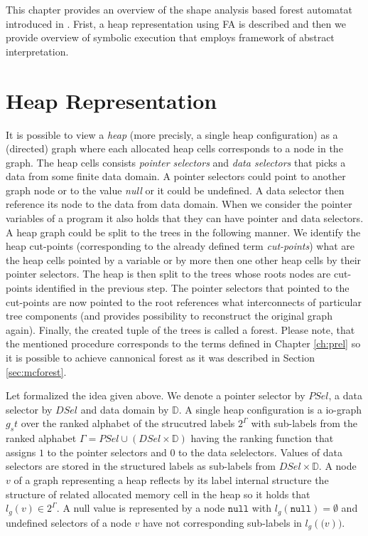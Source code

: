 This chapter provides an overview of the shape analysis based forest automatat introduced in \cite{formalmethods}.
Frist, a heap representation using FA is described and then
we provide overview of symbolic execution that employs framework of abstract interpretation.

\section{Heap Representation}
\label{sec:hd}

It is possible to view a \emph{heap} (more precisly, a single heap configuration)
as a (directed) graph where each allocated heap cells corresponds to a node in the graph.
The heap cells consists \emph{pointer selectors} and \emph{data selectors} that picks a data from some finite data domain.
A pointer selectors could point to another graph node or to the value \emph{null} or it could be undefined.
A data selector then reference its node to the data from data domain.
When we consider the pointer variables of a program it also holds that they can have pointer and data selectors.
A heap graph could be split to the trees in the following manner.
We identify the heap cut-points (corresponding to the already defined term \emph{cut-points})
what are the heap cells pointed by a variable or by more then one other heap cells by their pointer selectors.
The heap is then split to the trees whose roots nodes are cut-points identified in the previous step.
The pointer selectors that pointed to the cut-points are now pointed to the root references what interconnects
of particular tree components (and provides possibility to reconstruct the original graph again).
Finally, the created tuple of the trees is called a forest.
Please note, that the mentioned procedure corresponds to the terms defined in Chapter \ref{ch:prel}
so it is possible to achieve cannonical forest as it was described in Section \ref{sec:mcforest}.

Let formalized the idea given above.
We denote a pointer selector by $PSel$, a data selector by $DSel$ and data domain by $\mathbb{D}$.
A single heap configuration is a io-graph $g_st$ over the ranked alphabet of the strucutred labels $2^\Gamma$
with sub-labels from the ranked alphabet $\Gamma = PSel \cup (DSel \times \mathbb{D})$ having the
ranking function that assigns $1$ to the pointer selectors and $0$ to the data selelectors.
Values of data selectors are stored in the structured labels as sub-labels from $DSel \times \mathbb{D}$.
A node $v$ of a graph representing a heap reflects by its label internal structure the structure of
related allocated memory cell in the heap so it holds that $l_g(v) \in 2^\Gamma$.
A null value is represented by a node $\texttt{null}$ with $l_g(\texttt{null}) = \emptyset$
and undefined selectors of a node $v$ have not corresponding  sub-labels in $l_g(\texttt(v))$.


